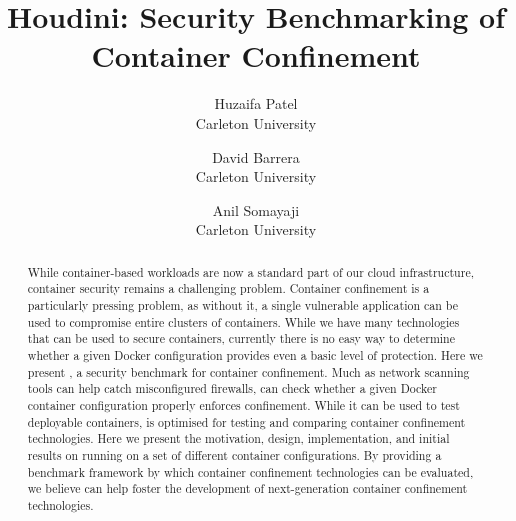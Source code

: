 \documentclass[letterpaper,twocolumn,10pt]{article}
\begin{document}


\title{\Large \bf Houdini: Security Benchmarking of Container Confinement}
\author{
{\rm Huzaifa Patel}\\
Carleton University
\and
{\rm David Barrera}\\
Carleton University
\and
{\rm Anil Somayaji}\\
Carleton University
} %

\maketitle

\begin{abstract}
  While container-based workloads are now a standard part of our cloud infrastructure, container security remains a challenging problem. Container confinement is a particularly pressing problem, as without it, a single vulnerable application can be used to compromise entire clusters of containers. While we have many technologies that can be used to secure containers, currently there is no easy way to determine whether a given Docker configuration provides even a basic level of protection. Here we present \houdini, a security benchmark for container confinement. Much as network scanning tools can help catch misconfigured firewalls, \houdini can check whether a given Docker container configuration properly enforces confinement. While it can be used to test deployable containers, \houdini is optimised for testing and comparing container confinement technologies. Here we present the motivation, design, implementation, and initial results on running \houdini on a set of different container configurations. By providing a benchmark framework by which container confinement technologies can be evaluated, we believe \houdini can help foster the development of next-generation container confinement technologies.
\end{abstract}







% 






\end{document}
